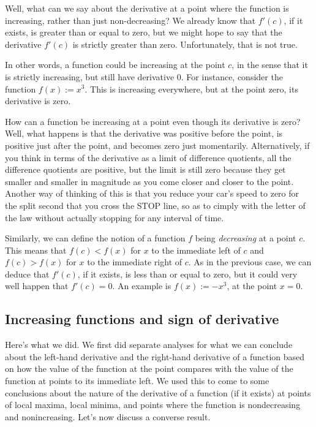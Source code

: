 \documentclass{amsart}
\begin{document}
Well, what can we say about the derivative at a point where the
function is increasing, rather than just non-decreasing? We already
know that $f'(c)$, if it exists, is greater than or equal to zero, but
we might hope to say that the derivative $f'(c)$ is strictly greater
than zero. Unfortunately, that is not true.

In other words, a function could be increasing at the point $c$, in
the sense that it is strictly increasing, but still have derivative
$0$. For instance, consider the function $f(x) := x^3$. This is
increasing everywhere, but at the point zero, its derivative is zero.

How can a function be increasing at a point even though its derivative
is zero? Well, what happens is that the derivative was positive before
the point, is positive just after the point, and becomes zero just
momentarily. Alternatively, if you think in terms of the derivative as
a limit of difference quotients, all the difference quotients are
positive, but the limit is still zero because they get smaller and
smaller in magnitude as you come closer and closer to the
point. Another way of thinking of this is that you reduce your car's
speed to zero for the split second that you cross the STOP line, so as
to cimply with the letter of the law without actually stopping for any
interval of time.

Similarly, we can define the notion of a function $f$ being {\em
decreasing} at a point $c$. This means that $f(c) < f(x)$ for $x$ to
the immediate left of $c$ and $f(c) > f(x)$ for $x$ to the immediate
right of $c$. As in the previous case, we can deduce that $f'(c)$, if
it exists, is less than or equal to zero, but it could very well
happen that $f'(c) = 0$. An example is $f(x) := -x^3$, at the point $x
= 0$.

\subsection{Increasing functions and sign of derivative}

Here's what we did. We first did separate analyses for what we can
conclude about the left-hand derivative and the right-hand derivative
of a function based on how the value of the function at the point
compares with the value of the function at points to its immediate
left. We used this to come to some conclusions about the nature of the
derivative of a function (if it exists) at points of local maxima,
local minima, and points where the function is nondecreasing and
nonincreasing. Let's now discuss a converse result.
\end{document}
